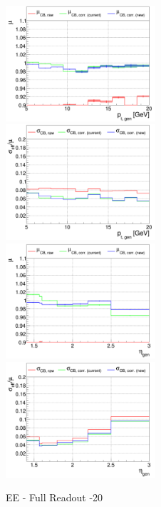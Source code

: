 \begin{figure}
\includegraphics[width=0.495\textwidth]{./plots_pdf/ECAL_plots/plotsPU/EE/FULL/pdf/GENPT/EEFULL_GENPT_0005_0020_MuOverBins.pdf}
\includegraphics[width=0.495\textwidth]{./plots_pdf/ECAL_plots/plotsPU/EE/FULL/pdf/GENPT/EEFULL_GENPT_0005_0020_EffSigmaOverBins.pdf}
\includegraphics[width=0.495\textwidth]{./plots_pdf/ECAL_plots/plotsPU/EE/FULL/pdf/GENETA/EEFULL_GENETA_0005_0020_MuOverBins.pdf}
\includegraphics[width=0.495\textwidth]{./plots_pdf/ECAL_plots/plotsPU/EE/FULL/pdf/GENETA/EEFULL_GENETA_0005_0020_EffSigmaOverBins.pdf}
\caption{EE - Full Readout -20}


\end{figure}
